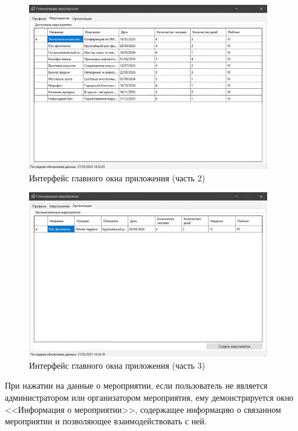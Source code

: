 \begin{figure}[h!]
	\centering
	\includegraphics[width=0.93\textwidth]{images/mainwindow-2.png}
	\caption{Интерфейс главного окна приложения (часть 2)} 
	\label{fig:app-mainwindow-2} 
\end{figure}

\begin{figure}[h!]
	\centering
	\includegraphics[width=0.93\textwidth]{images/mainwindow-3.png}
	\caption{Интерфейс главного окна приложения (часть 3)} 
	\label{fig:app-mainwindow-3} 
\end{figure}

При нажатии на данные о мероприятии, если пользователь не является администратором или организатором мероприятия, ему демонстрируется окно <<Информация о мероприятии>>, содержащее информацию о связанном мероприятии и позволяющее взаимодействовать с ней.

